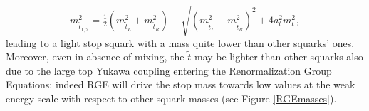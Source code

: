 \begin{equation}
m_{\tilde{t}_{1,2}}^{2} = \tfrac{1}{2}(m^{2}_{\tilde{t}_{L}} + m^{2}_{\tilde{t}_{R}}) \mp \sqrt{(m^{2}_{\tilde{t}_{L}} - m^{2}_{\tilde{t}_{R}})^{2} + 4a_{t}^{2}m_{t}^{2} },
\end{equation}leading to a light stop squark with a mass quite lower than other squarks' ones. Moreover, even in absence of mixing, the $\tilde{t}$ may be lighter than other squarks also due to the large top Yukawa coupling entering the Renormalization Group Equations; indeed RGE will drive the stop mass towards low values at the weak energy scale with respect to other squark masses (see Figure \ref{RGEmasses}).

